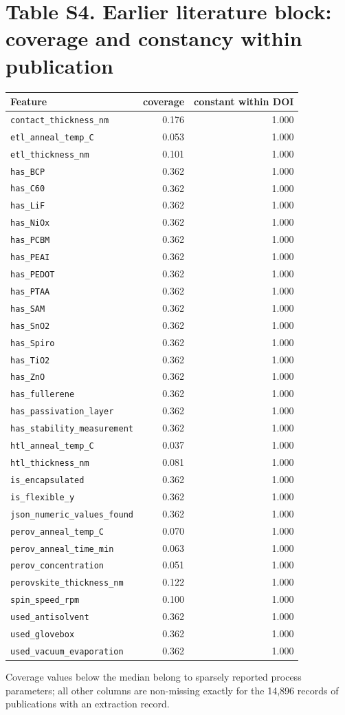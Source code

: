 \documentclass[10pt]{article}
\begin{document}
\section*{Table S4. Earlier literature block: coverage and constancy within publication}\begin{tabular}{lrr}\toprule Feature & coverage & constant within DOI\\\midrule
\texttt{contact\_thickness\_nm} & 0.176 & 1.000\\
\texttt{etl\_anneal\_temp\_C} & 0.053 & 1.000\\
\texttt{etl\_thickness\_nm} & 0.101 & 1.000\\
\texttt{has\_BCP} & 0.362 & 1.000\\
\texttt{has\_C60} & 0.362 & 1.000\\
\texttt{has\_LiF} & 0.362 & 1.000\\
\texttt{has\_NiOx} & 0.362 & 1.000\\
\texttt{has\_PCBM} & 0.362 & 1.000\\
\texttt{has\_PEAI} & 0.362 & 1.000\\
\texttt{has\_PEDOT} & 0.362 & 1.000\\
\texttt{has\_PTAA} & 0.362 & 1.000\\
\texttt{has\_SAM} & 0.362 & 1.000\\
\texttt{has\_SnO2} & 0.362 & 1.000\\
\texttt{has\_Spiro} & 0.362 & 1.000\\
\texttt{has\_TiO2} & 0.362 & 1.000\\
\texttt{has\_ZnO} & 0.362 & 1.000\\
\texttt{has\_fullerene} & 0.362 & 1.000\\
\texttt{has\_passivation\_layer} & 0.362 & 1.000\\
\texttt{has\_stability\_measurement} & 0.362 & 1.000\\
\texttt{htl\_anneal\_temp\_C} & 0.037 & 1.000\\
\texttt{htl\_thickness\_nm} & 0.081 & 1.000\\
\texttt{is\_encapsulated} & 0.362 & 1.000\\
\texttt{is\_flexible\_y} & 0.362 & 1.000\\
\texttt{json\_numeric\_values\_found} & 0.362 & 1.000\\
\texttt{perov\_anneal\_temp\_C} & 0.070 & 1.000\\
\texttt{perov\_anneal\_time\_min} & 0.063 & 1.000\\
\texttt{perov\_concentration} & 0.051 & 1.000\\
\texttt{perovskite\_thickness\_nm} & 0.122 & 1.000\\
\texttt{spin\_speed\_rpm} & 0.100 & 1.000\\
\texttt{used\_antisolvent} & 0.362 & 1.000\\
\texttt{used\_glovebox} & 0.362 & 1.000\\
\texttt{used\_vacuum\_evaporation} & 0.362 & 1.000\\
\bottomrule\end{tabular}\par\smallskip Coverage values below the median belong to sparsely reported process parameters; all other columns are non-missing exactly for the 14,896 records of publications with an extraction record.
\end{document}
